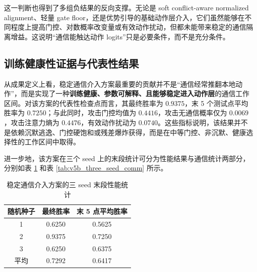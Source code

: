 这一判断也得到了多组负结果的反向支撑。无论是 soft conflict-aware normalized alignment、轻量 gate floor，还是优势引导的基础动作层介入，它们虽然能够在不同程度上提高门控、对数概率改变量或有效动作扰动，但都未能带来稳定的通信隔离增益。这说明“通信能触达动作 logits”只是必要条件，而不是充分条件。

\subsection{训练健康性证据与代表性结果}

从成果定义上看，稳定通信介入方案最重要的贡献并不是“通信经常推翻本地动作”，而是实现了一种\textbf{训练健康、参数可解释、且能够稳定进入动作层}的通信工作区间。对该方案的代表性检查点而言，其最终胜率为 $0.9375$，末 5 个测试点平均胜率为 $0.7250$；与此同时，攻击门控均值为 $0.4416$，攻击无通信概率仅为 $0.0069$，攻击注意力熵为 $0.4476$，有效动作扰动为 $0.0740$。这些指标说明，该结果并不是依赖沉默逃逸、门控硬饱和或残差爆炸获得，而是在中等门控、非沉默、健康选择性的工作区间中取得。

进一步地，该方案在三个 seed 上的末段统计可分为性能结果与通信统计两部分，分别如表 \ref{tab:v5b_three_seed_perf} 和表 \ref{tab:v5b_three_seed_comm} 所示。

\begin{table}[htbp]
    \centering
    \caption{稳定通信介入方案的三 seed 末段性能统计}
    \label{tab:v5b_three_seed_perf}
    {\renewcommand{\arraystretch}{1.28}
    \setlength{\extrarowheight}{1pt}
    \setlength{\tabcolsep}{8pt}
    \begin{tabular}{ccc}
        \toprule
        随机种子 & 最终胜率 & 末 5 点平均胜率 \\
        \midrule
        1 & 0.6250 & 0.5625 \\
        2 & 0.9375 & 0.7250 \\
        3 & 0.6250 & 0.6375 \\
        平均 & 0.7292 & 0.6417 \\
        \bottomrule
    \end{tabular}}
\end{table}

